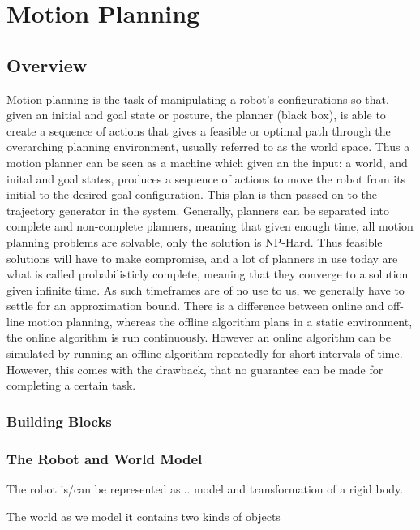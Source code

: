 \chapter{Motion Planning}
\label{sec:MotionPlanning}

\section{Overview}
Motion planning is the task of manipulating a robot's configurations so that,
given an initial and goal state or posture, the planner (black box), is able
to create a sequence of actions that gives a feasible or optimal path through
the overarching planning environment, usually referred to as the world space.
Thus a motion planner can be seen as a machine which given an the input: a
world, and inital and goal states, produces a sequence of actions to move the
robot from its initial to the desired goal configuration. This plan is then
passed on to the trajectory generator in the system. Generally, planners can be
separated into complete and non-complete planners, meaning that given enough
time, all motion planning problems are solvable, only the solution is NP-Hard.
Thus feasible solutions will have to make compromise, and a lot of planners in
use today are what is called probabilisticly complete, meaning that they
converge to a solution given infinite time. As such timeframes are of no use to
us, we generally have to settle for an approximation bound. There is a
difference between online and off-line motion planning, whereas the offline
algorithm plans in a static environment, the online algorithm is run
continuously. However an online algorithm can be simulated by running an offline
algorithm repeatedly for short intervals of time. However, this comes with the
drawback, that no guarantee can be made for completing a certain task.

\subsection{Building Blocks}

\subsection{The Robot and World Model}

The robot is/can be represented as...
model and transformation of a rigid body.

The world as we model it contains two kinds of objects

